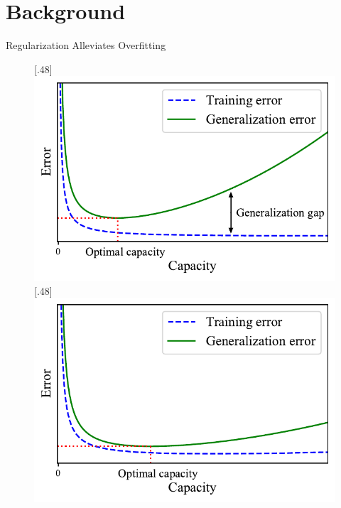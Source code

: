 \section{Background}

\begin{frame}{Regularization Alleviates Overfitting}

\begin{figure}
[.48\textwidth]{\includegraphics[width=.48\textwidth]{figs/gap1.pdf}}
[.48\textwidth]{\includegraphics[width=.48\textwidth]{figs/gap2.pdf}}
\end{figure}

\end{frame}

